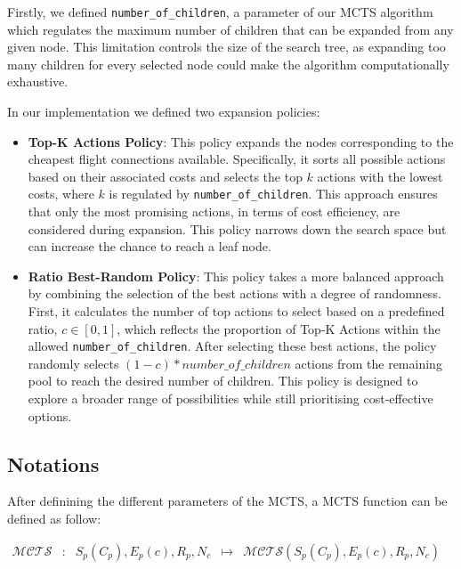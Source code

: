 Firstly, we defined \texttt{number\_of\_children}, a parameter of our MCTS algorithm which regulates the maximum number of children that can be expanded from any given node. This limitation controls the size of the search tree, as expanding too many children for every selected node could make the algorithm computationally exhaustive.

In our implementation we defined two expansion policies:

\begin{itemize}
    \item \textbf{Top-K Actions Policy}: This policy expands the nodes corresponding to the cheapest flight connections available. Specifically, it sorts all possible actions based on their associated costs and selects the top \(k\) actions with the lowest costs, where \(k\) is regulated by \texttt{number\_of\_children}. This approach ensures that only the most promising actions, in terms of cost efficiency, are considered during expansion. This policy narrows down the search space but can increase the chance to reach a leaf node.
    \item \textbf{Ratio Best-Random Policy}: This policy takes a more balanced approach by combining the selection of the best actions with a degree of randomness. First, it calculates the number of top actions to select based on a predefined ratio, \(c \in [0,1]\), which reflects the proportion of Top-K Actions within the allowed \texttt{number\_of\_children}. After selecting these best actions, the policy randomly selects $(1-c)*number\_of\_children$ actions from the remaining pool to reach the desired number of children. This policy is designed to explore a broader range of possibilities while still prioritising cost-effective options.
\end{itemize}

\subsection{Notations}
\label{sub:notations}

After definining the different parameters of the MCTS, a MCTS function can be defined as follow:

\begin{center}
    \centering
    $\begin{array}{ccccc}
            \mathcal{MCTS} & : & S_p(C_p), E_p(c), R_p, N_c & \mapsto & \mathcal{MCTS}(S_p(C_p), E_p(c), R_p, N_c) \\
        \end{array}$
\end{center}

